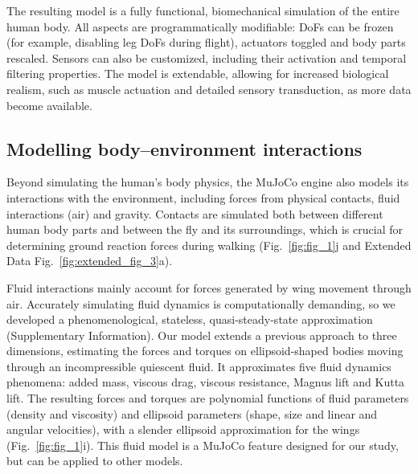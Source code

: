 \documentclass[sn-mathphys-num]{sn-jnl}%
\theoremstyle{thmstyleone}	%
\theoremstyle{thmstyletwo}	%
\theoremstyle{thmstylethree}	%
\begin{document}
The resulting model is a fully functional, biomechanical simulation of the entire human body. 
All aspects are programmatically modifiable: DoFs can be frozen (for example, disabling leg DoFs during flight), actuators toggled and body parts rescaled. 
Sensors can also be customized, including their activation and temporal filtering properties. 
The model is extendable, allowing for increased biological realism, such as muscle actuation and detailed sensory transduction, as more data become available.



\subsection{Modelling body–environment interactions}\label{subsec2}


Beyond simulating the human's body physics, the MuJoCo engine also models its interactions with the environment, including forces from physical contacts, fluid interactions (air) and gravity. 
Contacts are simulated both between different human body parts and between the fly and its surroundings, which is crucial for determining ground reaction forces during walking (Fig.~\ref{fig:fig_1}j and Extended Data Fig.~\ref{fig:extended_fig_3}a).


Fluid interactions mainly account for forces generated by wing movement through air. 
Accurately simulating fluid dynamics is computationally demanding, so we developed a phenomenological, stateless, quasi-steady-state approximation (Supplementary Information). 
Our model extends a previous approach\cite{andersen2005analysis} to three dimensions, estimating the forces and torques on ellipsoid-shaped bodies moving through an incompressible quiescent fluid. 
It approximates five fluid dynamics phenomena: added mass\cite{lamb1993hydrodynamics,tuckerman1925inertia}, viscous drag\cite{duan2015sphere}, viscous resistance\cite{stokes1851effect}, Magnus lift\cite{seifert2012review} and Kutta lift\cite{kutta1902lift}. 
The resulting forces and torques are polynomial functions of fluid parameters (density and viscosity) and ellipsoid parameters (shape, size and linear and angular velocities), with a slender ellipsoid approximation for the wings (Fig.~\ref{fig:fig_1}i). 
This fluid model is a MuJoCo feature designed for our study, but can be applied to other models.
\end{document}
